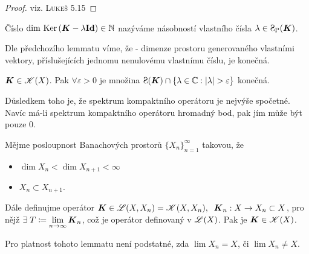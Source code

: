\begin{proof}
viz. \textsc{Lukeš 5.15}
\end{proof}

\begin{definition}
Číslo $\dim \, \operatorname{Ker}\, (\boldsymbol{K} - \lambda \boldsymbol{\mathrm{Id}} )\in\mathbb{N}$ nazýváme násobností vlastního čísla $\lambda\in\SpP(\map K)$.
\end{definition}

Dle předchozího lemmatu víme, že  - dimenze prostoru generovaného vlastními vektory, příslušejících jednomu nenulovému vlastnímu číslu, je konečná.

\begin{lemma}%
$\boldsymbol{K} \in \mathscr{K}(X)$. Pak $\forall\varepsilon>0$ je množina 
    $\Sp(\map K) \cap \left \lbrace \lambda \in \C : |\lambda| > \varepsilon \right \rbrace$ konečná.
\end{lemma}
Důsledkem toho je, že spektrum kompaktního operátoru je nejvýše spočetné. Navíc má-li spektrum kompaktního operátoru hromadný bod, pak jím může být pouze $0$.

\begin{lemma}
Mějme posloupnost Banachových prostorů $\{X_n\}_{n=1}^\infty$ takovou, že
\begin{itemize}
    \item $ \dim X_n<\dim X_{n+1}<\infty$ 
    \item $X_n\subset X_{n+1}$.
\end{itemize}
Dále definujme operátor $\boldsymbol{K}\in\mathscr{L}(X,X_n)=\mathscr{K}(X,X_n),\;\;\boldsymbol{K}_n: X\to X_n\subset X$, pro nějž $\exists  \; T\coloneqq \lim\limits_{n\rightarrow \infty} \boldsymbol{K}_n$, což je operátor definovaný v $\mathscr{L}(X)$. Pak je $\boldsymbol{K}\in \mathscr{K}(X)$.

\end{lemma}

\begin{corollary}
Pro platnost tohoto lemmatu není podstatné, zda $\lim X_n= X$, či $\lim X_n\neq X$.
\end{corollary}


\pagebreak
